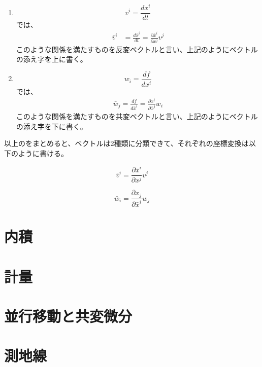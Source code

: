 \documentclass[dvipdfmx]{report} %
\begin{document}
\begin{enumerate}[(1)\,]

\item{}
\[ v^i = \frac{dx^i}{dt}\]
では、
\begin{equation*}
\begin{split}
	\bar{v}^i &= \frac{d\bar{x}^i}{dt} = \frac{\partial \bar{x}^i}{\partial x^j} v^j
\end{split}
\end{equation*}
このような関係を満たすものを反変ベクトルと言い、上記のようにベクトルの添え字を上に書く。

\item{}
\[ w_i = \frac{df}{dx^i} \]
では、
\begin{equation*}
\begin{split}
	\bar{w}_j = \frac{df}{d\bar{x}^i}  = \frac{\partial x^i}{\partial \bar{x}^j} w_i
\end{split}
\end{equation*}
このような関係を満たすものを共変ベクトルと言い、上記のようにベクトルの添え字を下に書く。

\end{enumerate}
以上のをまとめると、ベクトルは2種類に分類できて、それぞれの座標変換は以下のように書ける。
\begin{tcolorbox}[title=反変ベクトルの変換則]
	\[ \bar{v}^i = \frac{\partial \bar{x}^i}{\partial x^j} v^j \]
\end{tcolorbox}
\begin{tcolorbox}[title=共変ベクトルの変換則]
	\[ \bar{w}_i = \frac{\partial x_j}{\partial \bar{x}^i} w_j \]
\end{tcolorbox}


\section{内積}


\section{計量}


\section{並行移動と共変微分}


\section{測地線}
\end{document}
